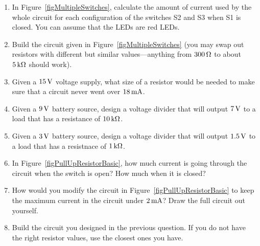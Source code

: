 
\begin{enumerate}
\item In Figure~\ref{figMultipleSwitches}, calculate the amount of current used by the whole circuit for each configuration of the switches S2 and S3 when S1 is closed.  You can assume that the LEDs are red LEDs.
\item Build the circuit given in Figure~\ref{figMultipleSwitches} (you may swap out resistors with different but similar values---anything from $300\,\si{\ohm}$ to about $5\,\si{\kilo\ohm}$ should work).
\item Given a $15\,\si{\volt}$ voltage supply, what size of a resistor would be needed to make sure that a circuit never went over $18\,\si{\milli\ampere}$.
\item Given a $9\,\si{\volt}$ battery source, design a voltage divider that will output $7\,\si{\volt}$ to a load that has a resistance of $10\,\si{\kilo\ohm}$.
\item Given a $3\,\si{\volt}$ battery source, design a voltage divider that will output $1.5\,\si{\volt}$ to a load that has a resistnace of $1\,\si{\kilo\ohm}$.
\item In Figure~\ref{figPullUpResistorBasic}, how much current is going through the circuit when the switch is open?  How much when it is closed?
\item How would you modify the circuit in Figure~\ref{figPullUpResistorBasic} to keep the maximum current in the circuit under $2\,\si{\milli\ampere}$?  Draw the full circuit out yourself.
\item Build the circuit you designed in the previous question.  If you do not have the right resistor values, use the closest ones you have.
\end{enumerate}
